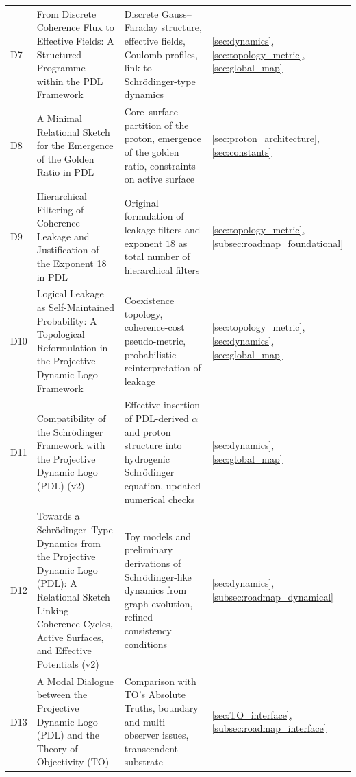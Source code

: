 \documentclass{article}
\begin{document}
\begin{longtable}{@{}p{0.9cm}L{5cm}L{5cm}p{4.4cm}@{}}
  D7 &
  From Discrete Coherence Flux to Effective Fields: A Structured Programme within the PDL Framework &
  Discrete Gauss–Faraday structure, effective fields, Coulomb profiles, link to Schr\"odinger-type dynamics &
  \ref{sec:dynamics}, \ref{sec:topology_metric}, \ref{sec:global_map} \\[0.4em]

  D8 &
  A Minimal Relational Sketch for the Emergence of the Golden Ratio in PDL &
  Core–surface partition of the proton, emergence of the golden ratio, constraints on active surface &
  \ref{sec:proton_architecture}, \ref{sec:constants} \\[0.4em]

  D9 &
  Hierarchical Filtering of Coherence Leakage and Justification of the Exponent 18 in PDL &
  Original formulation of leakage filters and exponent $18$ as total number of hierarchical filters &
  \ref{sec:topology_metric}, \ref{subsec:roadmap_foundational} \\[0.4em]

  D10 &
  Logical Leakage as Self-Maintained Probability: A Topological Reformulation in the Projective Dynamic Logo Framework &
  Coexistence topology, coherence-cost pseudo-metric, probabilistic reinterpretation of leakage &
  \ref{sec:topology_metric}, \ref{sec:dynamics}, \ref{sec:global_map} \\[0.4em]

  D11 &
  Compatibility of the Schr\"odinger Framework with the Projective Dynamic Logo (PDL) (v2) &
  Effective insertion of PDL-derived $\alpha$ and proton structure into hydrogenic Schr\"odinger equation, updated numerical checks &
  \ref{sec:dynamics}, \ref{sec:global_map} \\[0.4em]

  D12 &
  Towards a Schr\"odinger--Type Dynamics from the Projective Dynamic Logo (PDL): A Relational Sketch Linking Coherence Cycles, Active Surfaces, and Effective Potentials (v2) &
  Toy models and preliminary derivations of Schr\"odinger-like dynamics from graph evolution, refined consistency conditions &
  \ref{sec:dynamics}, \ref{subsec:roadmap_dynamical} \\[0.4em]

  D13 &
  A Modal Dialogue between the Projective Dynamic Logo (PDL) and the Theory of Objectivity (TO) &
  Comparison with TO's Absolute Truths, boundary and multi-observer issues, transcendent substrate &
  \ref{sec:TO_interface}, \ref{subsec:roadmap_interface} \\[0.4em]


\end{longtable}
\end{document}
